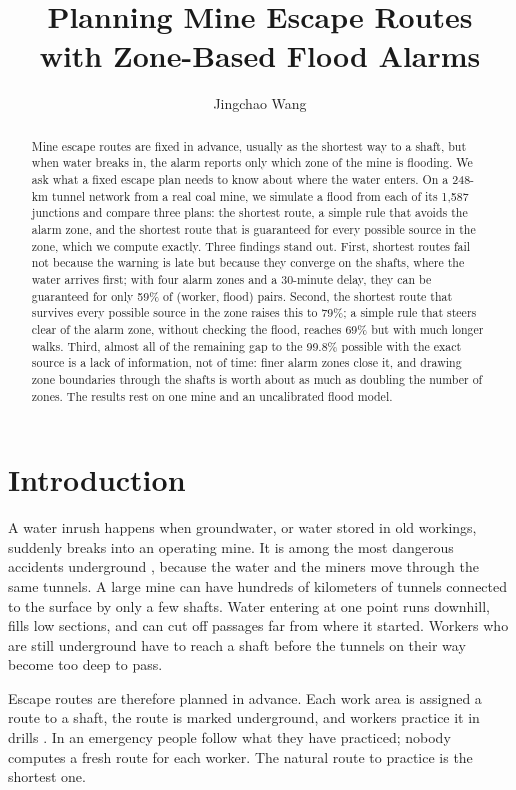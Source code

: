 \documentclass[11pt,a4paper]{article}
\title{Planning Mine Escape Routes\\with Zone-Based Flood Alarms}
\author{Jingchao Wang}
\date{}
\begin{document}
\maketitle
\begin{abstract}
Mine escape routes are fixed in advance, usually as the shortest way to a shaft, but when water breaks in, the alarm reports only which zone of the mine is flooding. We ask what a fixed escape plan needs to know about where the water enters. On a 248-km tunnel network from a real coal mine, we simulate a flood from each of its 1,587 junctions and compare three plans: the shortest route, a simple rule that avoids the alarm zone, and the shortest route that is guaranteed for every possible source in the zone, which we compute exactly. Three findings stand out. First, shortest routes fail not because the warning is late but because they converge on the shafts, where the water arrives first; with four alarm zones and a 30-minute delay, they can be guaranteed for only 59\% of (worker, flood) pairs. Second, the shortest route that survives every possible source in the zone raises this to 79\%; a simple rule that steers clear of the alarm zone, without checking the flood, reaches 69\% but with much longer walks. Third, almost all of the remaining gap to the 99.8\% possible with the exact source is a lack of information, not of time: finer alarm zones close it, and drawing zone boundaries through the shafts is worth about as much as doubling the number of zones. The results rest on one mine and an uncalibrated flood model.
\end{abstract}

\section{Introduction}
A water inrush happens when groundwater, or water stored in old workings, suddenly breaks into an operating mine. It is among the most dangerous accidents underground \cite{cumcm,sun2016,sun2024}, because the water and the miners move through the same tunnels. A large mine can have hundreds of kilometers of tunnels connected to the surface by only a few shafts. Water entering at one point runs downhill, fills low sections, and can cut off passages far from where it started. Workers who are still underground have to reach a shaft before the tunnels on their way become too deep to pass.

Escape routes are therefore planned in advance. Each work area is assigned a route to a shaft, the route is marked underground, and workers practice it in drills \cite{nrc2013}. In an emergency people follow what they have practiced; nobody computes a fresh route for each worker. The natural route to practice is the shortest one.
\end{document}
